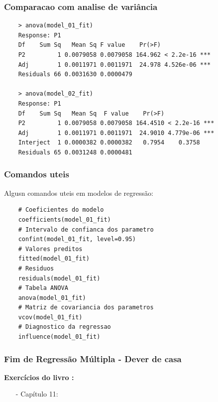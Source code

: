 \documentclass[graphics,14pt]{beamer}
\begin{document}
\begin{frame}[t,fragile=singleslide]
	\frametitle{Comparacao com analise de variância}
	\begin{lstlisting}
	> anova(model_01_fit) 
	Response: P1
	Df    Sum Sq   Mean Sq F value    Pr(>F)    
	P2         1 0.0079058 0.0079058 164.962 < 2.2e-16 ***
	Adj        1 0.0011971 0.0011971  24.978 4.526e-06 ***
	Residuals 66 0.0031630 0.0000479 
	
	> anova(model_02_fit) 
	Response: P1
	Df    Sum Sq   Mean Sq  F value    Pr(>F)    
	P2         1 0.0079058 0.0079058 164.4510 < 2.2e-16 ***
	Adj        1 0.0011971 0.0011971  24.9010 4.779e-06 ***
	Interject  1 0.0000382 0.0000382   0.7954    0.3758    
	Residuals 65 0.0031248 0.0000481 
	\end{lstlisting}
\end{frame}
\begin{frame}[t,fragile=singleslide]
	\frametitle{Comandos uteis}
	
	Algusn comandos uteis em modelos de regressão:
	
	\begin{lstlisting}
	# Coeficientes do modelo
	coefficients(model_01_fit) 
	# Intervalo de confianca dos parametro
	confint(model_01_fit, level=0.95) 
	# Valores preditos
	fitted(model_01_fit) 
	# Residuos
	residuals(model_01_fit) 
	# Tabela ANOVA
	anova(model_01_fit) 
	# Matriz de covariancia dos parametros
	vcov(model_01_fit) 
	# Diagnostico da regressao
	influence(model_01_fit)
	\end{lstlisting}
\end{frame}
\begin{frame}[t,fragile=singleslide]
	\frametitle{Fim de Regressão Múltipla - Dever de casa}
	\textbf{Exercícios do livro \cite{Agresti2018}:}
	\begin{itemize}
		\item[-] Capítulo 11: %
	\end{itemize}
\end{frame}
\end{document}
